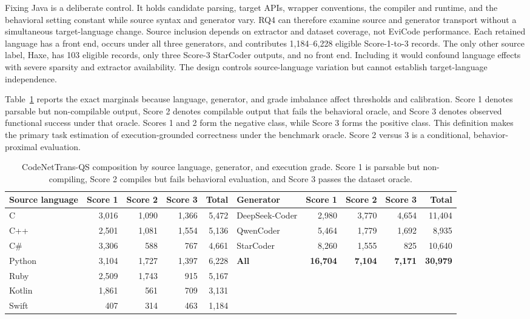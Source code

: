 \documentclass[conference]{IEEEtran}
\begin{document}
Fixing Java is a deliberate control. It holds candidate parsing, target APIs, wrapper conventions, the compiler and runtime, and the behavioral setting constant while source syntax and generator vary. RQ4 can therefore examine source and generator transport without a simultaneous target-language change. Source inclusion depends on extractor and dataset coverage, not EviCode performance. Each retained language has a front end, occurs under all three generators, and contributes 1,184--6,228 eligible Score-1-to-3 records. The only other source label, Haxe, has 103 eligible records, only three Score-3 StarCoder outputs, and no front end. Including it would confound language effects with severe sparsity and extractor availability. The design controls source-language variation but cannot establish target-language independence.

Table~\ref{tab:data} reports the exact marginals because language, generator, and grade imbalance affect thresholds and calibration. Score 1 denotes parsable but non-compilable output, Score 2 denotes compilable output that fails the behavioral oracle, and Score 3 denotes observed functional success under that oracle. Scores 1 and 2 form the negative class, while Score 3 forms the positive class. This definition makes the primary task estimation of execution-grounded correctness under the benchmark oracle. Score 2 versus 3 is a conditional, behavior-proximal evaluation.

\begin{table}[t]
\centering
\caption{CodeNetTrans-QS composition by source language, generator, and execution grade. Score 1 is parsable but non-compiling, Score 2 compiles but fails behavioral evaluation, and Score 3 passes the dataset oracle.}
\label{tab:data}
\begin{tabular}{@{}lrrrr@{\qquad}lrrrr@{}}
\toprule
Source language & Score 1 & Score 2 & Score 3 & Total & Generator & Score 1 & Score 2 & Score 3 & Total \\
\midrule
C      & 3,016 & 1,090 & 1,366 & 5,472 & DeepSeek-Coder & 2,980 & 3,770 & 4,654 & 11,404 \\
C++    & 2,501 & 1,081 & 1,554 & 5,136 & QwenCoder      & 5,464 & 1,779 & 1,692 & 8,935 \\
C\#   & 3,306 &   588 &   767 & 4,661 & StarCoder      & 8,260 & 1,555 &   825 & 10,640 \\
Python & 3,104 & 1,727 & 1,397 & 6,228 & \textbf{All} & \textbf{16,704} & \textbf{7,104} & \textbf{7,171} & \textbf{30,979} \\
Ruby   & 2,509 & 1,743 &   915 & 5,167 & & & & & \\
Kotlin & 1,861 &   561 &   709 & 3,131 & & & & & \\
Swift  &   407 &   314 &   463 & 1,184 & & & & & \\
\bottomrule
\end{tabular}
\end{table}
\end{document}
